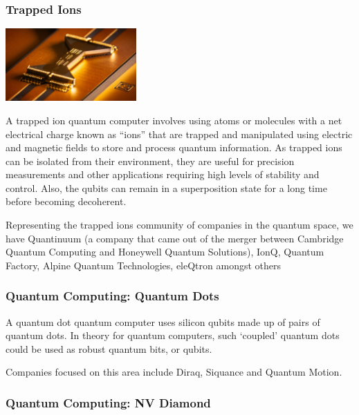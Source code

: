 \documentclass{beamer}
\begin{document}
\begin{frame} \frametitle{Trapped Ions}
\begin{center}
\includegraphics[width=5cm]{fig/qscoutTrappedIon.jpg}
\end{center}

A trapped ion quantum computer involves using atoms or molecules with a net electrical charge known as “ions” that are trapped and manipulated using electric and magnetic fields to store and process quantum information. As trapped ions can be isolated from their environment, they are useful for precision measurements and other applications requiring high levels of stability and control. Also, the qubits can remain in a superposition state for a long time before becoming decoherent.

Representing the trapped ions community of companies in the quantum space, we have Quantinuum (a company that came out of the merger between Cambridge Quantum Computing and Honeywell Quantum Solutions), IonQ, Quantum Factory, Alpine Quantum Technologies, eleQtron amongst others

\end{frame}


\begin{frame}\frametitle{Quantum Computing: Quantum Dots}
A quantum dot quantum computer uses silicon qubits made up of pairs of quantum dots. In theory for quantum computers, such ‘coupled’ quantum dots could be used as robust quantum bits, or qubits.

Companies focused on this area include Diraq, Siquance and Quantum Motion.
\end{frame}

\begin{frame}\frametitle{Quantum Computing: NV Diamond}

\end{frame}
\end{document}
